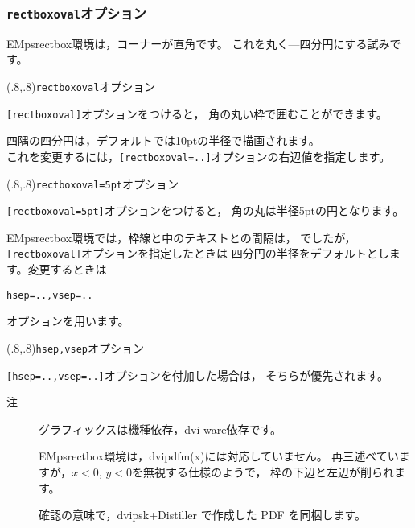 \documentclass[a4j]{jarticle}
\begin{document}
\subsubsection{\texttt{rectboxoval}オプション}
\textsf{EMpsrectbox}環境は，コーナーが直角です。
これを丸く---四分円にする試みです。

\begin{showEx}(.8,.8){\texttt{rectboxoval}オプション}
\begin{EMpsrectbox}[rectboxoval]
\texttt{[rectboxoval]}オプションをつけると，
角の丸い枠で囲むことができます。
\end{EMpsrectbox}
\end{showEx}

四隅の四分円は，デフォルトでは10ptの半径で描画されます。\\
これを変更するには，\verb+[rectboxoval=..]+オプションの右辺値を指定します。

\begin{showEx}(.8,.8){\texttt{rectboxoval=5pt}オプション}
\begin{EMpsrectbox}[rectboxoval=5pt]
\texttt{[rectboxoval=5pt]}オプションをつけると，
角の丸は半径5ptの円となります。
\end{EMpsrectbox}
\end{showEx}

\textsf{EMpsrectbox}環境では，枠線と中のテキストとの間隔は，
でしたが，\verb+[rectboxoval]+オプションを指定したときは
四分円の半径をデフォルトとします。変更するときは
\begin{jquote}
\begin{verbatim}
hsep=..,vsep=..
\end{verbatim}
\end{jquote}
オプションを用います。

\begin{showEx}(.8,.8){\texttt{hsep,vsep}オプション}
\begin{EMpsrectbox}[rectboxoval,hsep=2\zw,vsep=.5\zh]
\verb+[hsep=..,vsep=..]+オプションを付加した場合は，
そちらが優先されます。
\end{EMpsrectbox}
\end{showEx}

\begin{description}
\item[注　]グラフィックスは機種依存，dvi-ware依存です。

  \textsf{EMpsrectbox}環境は，dvipdfm(x)には対応していません。
  再三述べていますが，$x<0$, $y<0$を無視する仕様のようで，
  枠の下辺と左辺が削られます。
  
  確認の意味で，dvipsk+Distiller で作成した PDF を同梱します。
\end{description}
\end{document}
